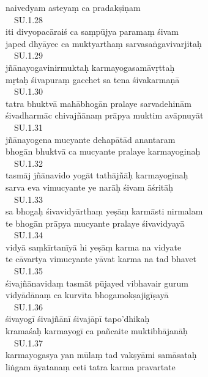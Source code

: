 \documentclass{tufte-handout}
\begin{document}
naivedyam asteyaṃ ca pradakṣiṇam\\\  \ SU.1.28\\iti divyopacāraiś ca saṃpūjya paramaṃ śivam\\japed dhyāyec ca muktyarthaṃ sarvasaṅgavivarjitaḥ\\\  \ SU.1.29\\jñānayogavinirmuktaḥ karmayogasamāvṛttaḥ\\mṛtaḥ śivapuraṃ gacchet sa tena śivakarmaṇā\\\  \ SU.1.30\\tatra bhuktvā mahābhogān pralaye sarvadehinām\\śivadharmāc chivajñānaṃ prāpya muktim avāpnuyāt\\\  \ SU.1.31\\jñānayogena mucyante dehapātād anantaram\\bhogān bhuktvā ca mucyante pralaye karmayoginaḥ\\\  \ SU.1.32\\tasmāj jñānavido yogāt tathājñāḥ karmayoginaḥ\\sarva eva vimucyante ye narāḥ śivam āśritāḥ\\\  \ SU.1.33\\sa bhogaḥ śivavidyārthaṃ yeṣāṃ karmāsti nirmalam\\te bhogān prāpya mucyante pralaye śivavidyayā\\\  \ SU.1.34\\vidyā saṃkīrtanīyā hi yeṣāṃ karma na vidyate\\te cāvartya vimucyante yāvat karma na tad bhavet\\\  \ SU.1.35\\śivajñānavidaṃ tasmāt pūjayed vibhavair gurum\\vidyādānaṃ ca kurvīta bhogamokṣajigīṣayā\\\  \ SU.1.36\\śivayogī śivajñānī śivajāpī tapo'dhikaḥ\\kramaśaḥ karmayogī ca pañcaite muktibhājanāḥ\\\  \ SU.1.37\\karmayogasya yan mūlaṃ tad vakṣyāmi samāsataḥ\\liṅgam āyatanaṃ ceti tatra karma pravartate\\\ 
\end{document}
